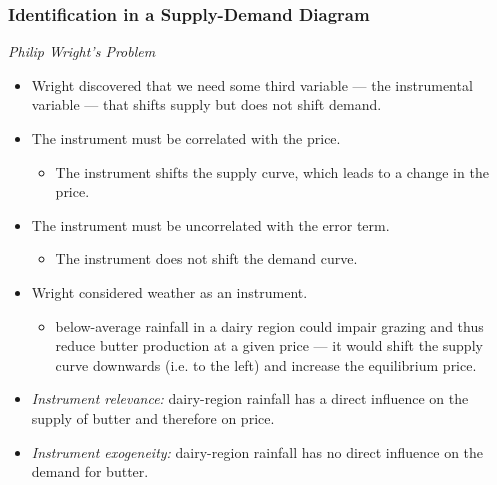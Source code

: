 \begin{frame}
\frametitle{Identification in a Supply-Demand Diagram}
\emph{Philip Wright's Problem} 
\begin{itemize}
\item Wright discovered that we need some third variable --- the instrumental variable --- that shifts supply but does not shift demand.
\item The instrument must be correlated with the price. 
\begin{itemize}
\item The instrument shifts the supply curve, which leads to a change in the price. 
\end{itemize}
\item The instrument must be uncorrelated with the error term. 
\begin{itemize}
\item The instrument does not shift the demand curve.
\end{itemize}
\item Wright considered weather as an instrument. 
\begin{itemize}
\item below-average rainfall in a dairy region could impair grazing and thus reduce butter production at a given price --- it would shift the supply curve downwards (i.e. to the left) and increase the equilibrium price.
\end{itemize}
\item \emph{Instrument relevance:}
\newlinequad
dairy-region rainfall has a direct influence on the supply of butter and therefore on price. 
\item \emph{Instrument exogeneity:} 
\newlinequad
dairy-region rainfall has no direct influence on the demand for butter. 
\end{itemize}
\end{frame}
